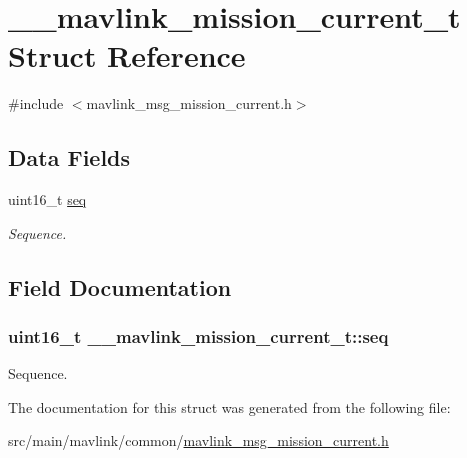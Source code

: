 \hypertarget{struct____mavlink__mission__current__t}{\section{\+\_\+\+\_\+mavlink\+\_\+mission\+\_\+current\+\_\+t Struct Reference}
\label{struct____mavlink__mission__current__t}
}


{\ttfamily \#include $<$mavlink\+\_\+msg\+\_\+mission\+\_\+current.\+h$>$}

\subsection*{Data Fields}
\begin{DoxyCompactItemize}
\item 
uint16\+\_\+t \hyperlink{struct____mavlink__mission__current__t_abf05ebfb452002e779838949ae335023}{seq}
\begin{DoxyCompactList}\small\item\em Sequence. \end{DoxyCompactList}\end{DoxyCompactItemize}


\subsection{Field Documentation}
\hypertarget{struct____mavlink__mission__current__t_abf05ebfb452002e779838949ae335023}{
\subsubsection[{seq}]{\setlength{\rightskip}{0pt plus 5cm}uint16\+\_\+t \+\_\+\+\_\+mavlink\+\_\+mission\+\_\+current\+\_\+t\+::seq}}\label{struct____mavlink__mission__current__t_abf05ebfb452002e779838949ae335023}


Sequence. 



The documentation for this struct was generated from the following file\+:\begin{DoxyCompactItemize}
\item 
src/main/mavlink/common/\hyperlink{mavlink__msg__mission__current_8h}{mavlink\+\_\+msg\+\_\+mission\+\_\+current.\+h}\end{DoxyCompactItemize}
